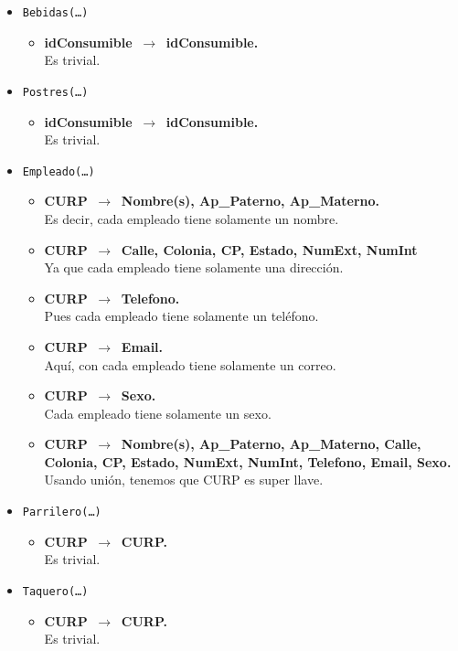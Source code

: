 \documentclass{article}
\newcommand{\flecha}{$\,\to\,$ }
\begin{document}
\begin{itemize}
\item \texttt{Bebidas(\ldots)}
	\begin{itemize}
		\item \textbf{idConsumible \flecha idConsumible.}\\
		Es trivial.
	\end{itemize}

\item \texttt{Postres(\ldots)}
	\begin{itemize}
		\item \textbf{idConsumible \flecha idConsumible.}\\
		Es trivial.
	\end{itemize}

\item \texttt{Empleado(\ldots)}
	\begin{itemize}
		\item \textbf{CURP \flecha Nombre(s), Ap\_Paterno, Ap\_Materno.}\\
		 Es decir, cada empleado tiene solamente un nombre.		
		\item \textbf{CURP \flecha Calle, Colonia, CP, Estado, NumExt, NumInt}\\
		Ya que cada empleado tiene solamente una dirección.
		\item \textbf{CURP \flecha Telefono.}\\
		Pues cada empleado tiene solamente un teléfono.
		\item \textbf{CURP \flecha Email.}\\
		Aquí, con cada empleado tiene solamente un correo.
		\item \textbf{CURP \flecha Sexo.}\\
		Cada empleado tiene solamente un sexo.
		\item \textbf{CURP \flecha Nombre(s), Ap\_Paterno, Ap\_Materno, Calle, Colonia, CP, Estado, NumExt, NumInt, Telefono, Email, Sexo.}\\
		Usando unión, tenemos que CURP es super llave.	
	\end{itemize}

\item \texttt{Parrilero(\ldots)}
	\begin{itemize}
		\item \textbf{CURP \flecha CURP.}\\
		Es trivial.
	\end{itemize}

\item \texttt{Taquero(\ldots)}
	\begin{itemize}
		\item \textbf{CURP \flecha CURP.}\\
		Es trivial.
	\end{itemize}


\end{itemize}
\end{document}
